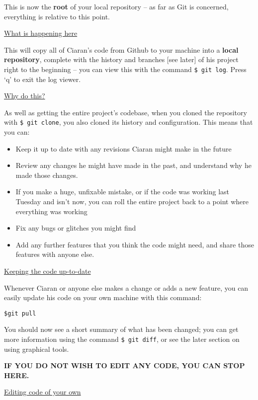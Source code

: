 \documentclass[11pt, a4paper, english]{article}
\begin{document}
This is now the \textbf{root} of your local repository – as far as Git is concerned, everything is relative to this point.


\underline{What is happening here}

This will copy all of Ciaran’s code from Github to your machine into a \textbf{local repository}, complete with the history and branches [see later] of his project right to the beginning – you can view this with the command \verb|$ git log|. Press ‘q’ to exit the log viewer.

\underline{Why do this?}

As well as getting the entire project’s codebase, when you cloned the repository with \verb|$ git clone|, you also cloned its history and configuration. This means that you can:

\begin{itemize}
\item Keep it up to date with any revisions Ciaran might make in the future
\item Review any changes he might have made in the past, and understand why he made those changes.
\item If you make a huge, unfixable mistake, or if the code was working last Tuesday and isn’t now, you can roll the entire project back to a point where everything was working
\item Fix any bugs or glitches you might find
\item Add any further features that you think the code might need, and share those features with anyone else.
\end{itemize}

\underline{Keeping the code up-to-date}

Whenever Ciaran or anyone else makes a change or adds a new feature, you can easily update his code on your own machine with this command:

\begin{verbatim}
$git pull
\end{verbatim}

You should now see a short summary of what has been changed; you can get more information using the command \verb|$ git diff|, or see the later section on using graphical tools.

\textbf{IF YOU DO NOT WISH TO EDIT ANY CODE, YOU CAN STOP HERE.}

\underline{Editing code of your own}
\end{document}
